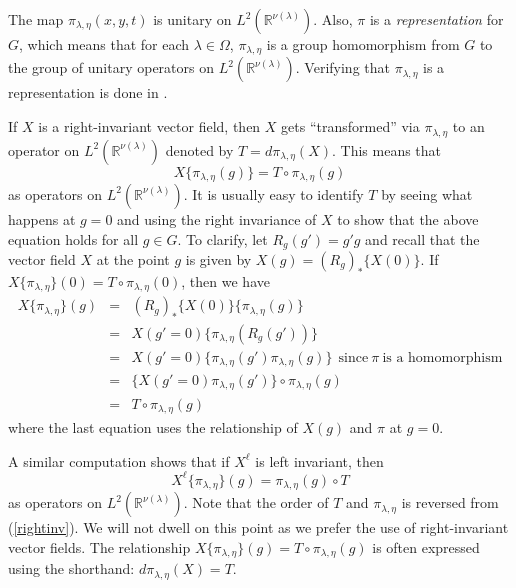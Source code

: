 \documentclass[12pt,reqno]{amsart}
\theoremstyle{definition}
\begin{document}
The map $\pi_{\lambda,\eta} (x,y,t)$ is unitary 
on $L^2 ({\mathbb{R}}^{\nu(\lambda)})$. Also, $\pi$ is a {\em representation }
for $G$, which means that for each $\lambda \in \Omega$,
$\pi_{\lambda,\eta}$ is a group homomorphism from $G$ to the group of 
unitary operators on $L^2({\mathbb{R}}^{\nu(\lambda)})$. Verifying that $\pi_{\lambda,\eta}$ is a representation
is done in \cite{PeRi03}.

If $X$ is a right-invariant vector field, then $X$ gets
``transformed'' via $\pi_{\lambda,\eta}$ to an operator on $L^2({\mathbb{R}}^{\nu(\lambda)})$ 
denoted by $T=d \pi_{\lambda,\eta} (X)$. This means
that
\begin{equation}
\label{rightinv}
X \{\pi_{\lambda,\eta} (g) \} =T \circ \pi_{\lambda,\eta} (g)
\end{equation}
as operators on $L^2({\mathbb{R}}^{\nu(\lambda)})$. It is usually easy to identify
$T$ by seeing what happens at $g=0$ and using the right
invariance of $X$ to show that the above equation holds for all $g \in G$.
To clarify, let $R_g (g') = g' g$ and recall
that the vector field $X$
at the point $g$ is given by $X (g) = (R_g)_* \{X (0)\}$. If $
X \{\pi_{\lambda,\eta} \} ( 0 )  = T\circ \pi_{\lambda,\eta} (0)$,
then we have 
\begin{eqnarray*}
X \{\pi_{\lambda,\eta} \} (g)  &=&
(R_g)_* \{X (0) \} \{\pi_{\lambda,\eta} (g) \} \\
&=& X (g'=0) \{ \pi_{\lambda,\eta} (R_g(g'))\} \\
&=&X (g'=0) \{ \pi_{\lambda,\eta} (g') \pi_{\lambda,\eta} (g)\} 
\ \ \textrm{since} \ \pi \ \textrm{is a homomorphism} \\
&=&  \{ X (g'=0)\pi_{\lambda,\eta} (g' ) \} \circ \pi_{\lambda,\eta} (g) \\
&=& T\circ \pi_{\lambda,\eta} (g) 
\end{eqnarray*}
where the last equation uses the relationship of $X (g)$
and $\pi$ at $g=0$.

A similar computation shows that if $X^\ell$ is left invariant,
then 
\[
X^\ell \{\pi_{\lambda,\eta} \} (g)  =  \pi_{\lambda,\eta} (g) \circ T
\]
as operators on $L^2({\mathbb{R}}^{\nu(\lambda)})$. Note that the order of $T$ and $\pi_{\lambda,\eta}$ is reversed
from (\ref{rightinv}). We will not dwell on this point as we prefer the use of right-invariant vector fields. 
The relationship $X \{\pi_{\lambda,\eta} \} (g)  = T \circ \pi_{\lambda,\eta} (g)$
is often expressed  using the shorthand:
$d \pi_{\lambda,\eta} (X) = T$.
\end{document}
